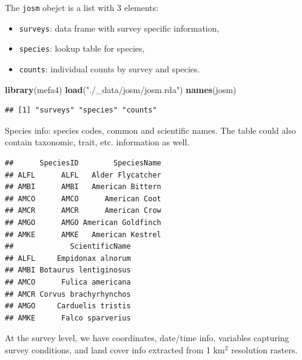 \documentclass[12pt,]{scrbook}
\newenvironment{Shaded}{\begin{snugshade}}{\end{snugshade}}
\newcommand{\KeywordTok}[1]{\textcolor[rgb]{0.13,0.29,0.53}{\textbf{#1}}}
\newcommand{\NormalTok}[1]{#1}
\newcommand{\OperatorTok}[1]{\textcolor[rgb]{0.81,0.36,0.00}{\textbf{#1}}}
\newcommand{\StringTok}[1]{\textcolor[rgb]{0.31,0.60,0.02}{#1}}
\providecommand{\tightlist}{%
  \setlength{\itemsep}{0pt}\setlength{\parskip}{0pt}}
\begin{document}
The \texttt{josm} obejct is a list with 3 elements:

\begin{itemize}
\tightlist
\item
  \texttt{surveys}: data frame with survey specific information,
\item
  \texttt{species}: lookup table for species,
\item
  \texttt{counts}: individual counts by survey and species.
\end{itemize}

\begin{Shaded}
\begin{Highlighting}[]
\KeywordTok{library}\NormalTok{(mefa4)}
\KeywordTok{load}\NormalTok{(}\StringTok{"./_data/josm/josm.rda"}\NormalTok{)}
\KeywordTok{names}\NormalTok{(josm)}
\end{Highlighting}
\end{Shaded}

\begin{verbatim}
## [1] "surveys" "species" "counts"
\end{verbatim}

Species info: species codes, common and scientific names. The table could also contain
taxonomic, trait, etc. information as well.

\begin{Shaded}
\end{Shaded}

\begin{verbatim}
##      SpeciesID        SpeciesName
## ALFL      ALFL   Alder Flycatcher
## AMBI      AMBI   American Bittern
## AMCO      AMCO      American Coot
## AMCR      AMCR      American Crow
## AMGO      AMGO American Goldfinch
## AMKE      AMKE   American Kestrel
##             ScientificName
## ALFL     Empidonax alnorum
## AMBI Botaurus lentiginosus
## AMCO      Fulica americana
## AMCR Corvus brachyrhynchos
## AMGO     Carduelis tristis
## AMKE      Falco sparverius
\end{verbatim}

At the survey level, we have coordinates, date/time info,
variables capturing survey conditions, and land cover info extracted from 1 km\(^2\) resolution rasters.

\begin{Shaded}
\end{Shaded}
\end{document}
